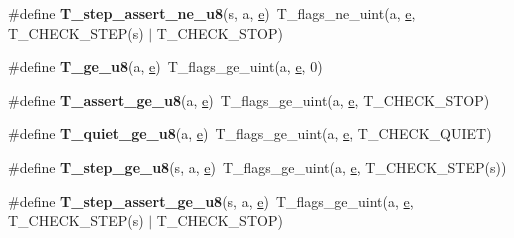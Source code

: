 \begin{DoxyCompactItemize}
\#define {\bfseries T\+\_\+step\+\_\+assert\+\_\+ne\+\_\+u8}(s,  a,  \mbox{\hyperlink{sun4u_2tte_8h_a8b0b9ed08e0e18920ec2682f48228c27}{e}})~T\+\_\+flags\+\_\+ne\+\_\+uint(a, \mbox{\hyperlink{sun4u_2tte_8h_a8b0b9ed08e0e18920ec2682f48228c27}{e}}, T\+\_\+\+C\+H\+E\+C\+K\+\_\+\+S\+T\+EP(s) $\vert$ T\+\_\+\+C\+H\+E\+C\+K\+\_\+\+S\+T\+OP)
\item 
\mbox{\label{group__RTEMSTestFrameworkChecksUInt8_gac322b3efde6d2018ea359ba1e1620f8b}} 
\#define {\bfseries T\+\_\+ge\+\_\+u8}(a,  \mbox{\hyperlink{sun4u_2tte_8h_a8b0b9ed08e0e18920ec2682f48228c27}{e}})~T\+\_\+flags\+\_\+ge\+\_\+uint(a, \mbox{\hyperlink{sun4u_2tte_8h_a8b0b9ed08e0e18920ec2682f48228c27}{e}}, 0)
\item 
\mbox{\label{group__RTEMSTestFrameworkChecksUInt8_ga31510549769c7b7e81727694a1467d25}} 
\#define {\bfseries T\+\_\+assert\+\_\+ge\+\_\+u8}(a,  \mbox{\hyperlink{sun4u_2tte_8h_a8b0b9ed08e0e18920ec2682f48228c27}{e}})~T\+\_\+flags\+\_\+ge\+\_\+uint(a, \mbox{\hyperlink{sun4u_2tte_8h_a8b0b9ed08e0e18920ec2682f48228c27}{e}}, T\+\_\+\+C\+H\+E\+C\+K\+\_\+\+S\+T\+OP)
\item 
\mbox{\label{group__RTEMSTestFrameworkChecksUInt8_gae62d778b8c621339d1c997818d99c849}} 
\#define {\bfseries T\+\_\+quiet\+\_\+ge\+\_\+u8}(a,  \mbox{\hyperlink{sun4u_2tte_8h_a8b0b9ed08e0e18920ec2682f48228c27}{e}})~T\+\_\+flags\+\_\+ge\+\_\+uint(a, \mbox{\hyperlink{sun4u_2tte_8h_a8b0b9ed08e0e18920ec2682f48228c27}{e}}, T\+\_\+\+C\+H\+E\+C\+K\+\_\+\+Q\+U\+I\+ET)
\item 
\mbox{\label{group__RTEMSTestFrameworkChecksUInt8_ga2db96d8c0be264cf72bba880b58357e3}} 
\#define {\bfseries T\+\_\+step\+\_\+ge\+\_\+u8}(s,  a,  \mbox{\hyperlink{sun4u_2tte_8h_a8b0b9ed08e0e18920ec2682f48228c27}{e}})~T\+\_\+flags\+\_\+ge\+\_\+uint(a, \mbox{\hyperlink{sun4u_2tte_8h_a8b0b9ed08e0e18920ec2682f48228c27}{e}}, T\+\_\+\+C\+H\+E\+C\+K\+\_\+\+S\+T\+EP(s))
\item 
\mbox{\label{group__RTEMSTestFrameworkChecksUInt8_ga45901325e020f15bfb65285a84807b27}} 
\#define {\bfseries T\+\_\+step\+\_\+assert\+\_\+ge\+\_\+u8}(s,  a,  \mbox{\hyperlink{sun4u_2tte_8h_a8b0b9ed08e0e18920ec2682f48228c27}{e}})~T\+\_\+flags\+\_\+ge\+\_\+uint(a, \mbox{\hyperlink{sun4u_2tte_8h_a8b0b9ed08e0e18920ec2682f48228c27}{e}}, T\+\_\+\+C\+H\+E\+C\+K\+\_\+\+S\+T\+EP(s) $\vert$ T\+\_\+\+C\+H\+E\+C\+K\+\_\+\+S\+T\+OP)

\end{DoxyCompactItemize}

